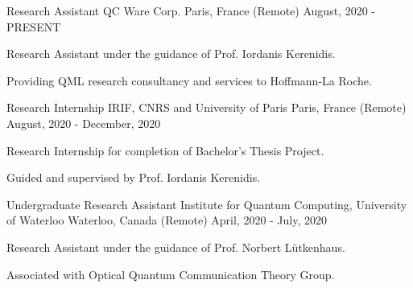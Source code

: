 

\begin{cventries}

  \cventry
    {Research Assistant} %
    {QC Ware Corp.} %
    {Paris, France (Remote)} %
    {August, 2020 - PRESENT} %
    {
      \begin{cvitems} %
        \item {Research Assistant under the guidance of Prof. Iordanis Kerenidis.}
        \item {Providing QML research consultancy and services to Hoffmann-La Roche.}
      \end{cvitems}
    }

  \cventry
    {Research Internship} %
    {IRIF, CNRS and  University of Paris} %
    {Paris, France (Remote)} %
    {August, 2020 - December, 2020} %
    {
      \begin{cvitems} %
        \item {Research Internship for completion of Bachelor's Thesis Project.}
        \item {Guided and supervised by Prof. Iordanis Kerenidis.}
      \end{cvitems}
    }

  \cventry
    {Undergraduate Research Assistant} %
    {Institute for Quantum Computing, University of Waterloo} %
    {Waterloo, Canada (Remote)} %
    {April, 2020 - July, 2020} %
    {
      \begin{cvitems} %
        \item {Research Assistant under the guidance of Prof. Norbert Lütkenhaus.}
        \item {Associated with Optical Quantum Communication Theory Group.}
      \end{cvitems}
    }


\end{cventries}

